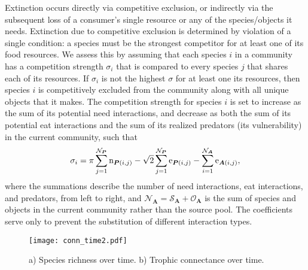 \documentclass[twocolumn,preprintnumbers,amsmath,amssymb,superscriptaddress]{revtex4}
\newcommand{\rr}[1]{{\rm #1}}
\begin{document}

Extinction occurs directly via competitive exclusion, or indirectly via the subsequent loss of a consumer's single resource or any of the species/objects it needs.
Extinction due to competitive exclusion is determined by violation of a single condition: a species must be the strongest competitor for at least one of its food resources.
We assess this by assuming that each species $i$ in a community has a competition strength $\sigma_i$ that is compared to every species $j$ that shares each of its resources.
If $\sigma_i$ is not the highest $\sigma$ for at least one its resources, then species $i$ is competitively excluded from the community along with all unique objects that it makes.
The competition strength for species $i$ is set to increase as the sum of its potential need interactions, and decrease as both the sum of its potential eat interactions and the sum of its realized predators (its vulnerability) in the current community, such that 
\begin{equation}
  \sigma_i = \pi \sum_{j=1}^{\mathcal{N}_{\bm P}} \rr{n}_{{\bm P}(i,j)} - \sqrt{2}\sum_{j=1}^{\mathcal{N}_{\bm P}} \rr{e}_{{\bm P}(i,j)} - \sum_{i=1}^{\mathcal{N}_{\bm A}} \rr{e}_{{\bm A}(i,j)},
\end{equation}
where the summations describe the number of need interactions, eat interactions, and predators, from left to right, and $\mathcal{N}_{\bm A} = \mathcal{S}_{\bm A} + \mathcal{O}_{\bm A}$ is the sum of species and objects in the current community rather than the source pool. 
The coefficients serve only to prevent the substitution of different interaction types.


\begin{figure*}
\centering
\texttt{[image: conn\_time2.pdf]}
\caption{
a) Species richness over time.
b) Trophic connectance over time.
}
\label{fig:conn}
\end{figure*} 
\end{document}
